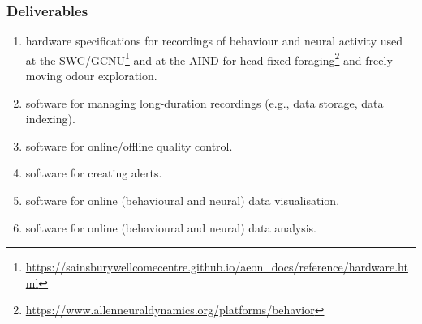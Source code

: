 
\begin{frame}
    \frametitle{Deliverables}

    \begin{enumerate}

        \item hardware specifications for recordings of behaviour and neural
        activity used at the
        SWC/GCNU\footnote{\url{https://sainsburywellcomecentre.github.io/aeon\_docs/reference/hardware.html}}
        and at the AIND for head-fixed
        foraging\footnote{\url{https://www.allenneuraldynamics.org/platforms/behavior}}
        and freely moving odour exploration.

        \item software for managing long-duration recordings (e.g., data storage, data
        indexing).

        \item software for online/offline quality control.

        \item software for creating alerts.

        \item software for online (behavioural and neural) data visualisation.

        \item software for online (behavioural and neural) data analysis.

    \end{enumerate}

\end{frame}

